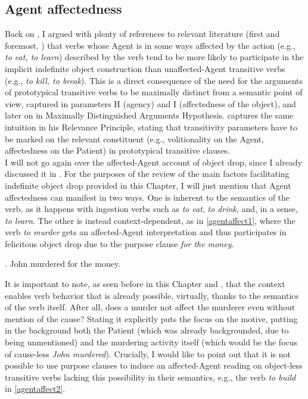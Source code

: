 \subsection{Agent affectedness} 

Back on , I argued with plenty of references to relevant literature (first and foremost, \textcite{Naess2007}) that verbs whose Agent is in some ways affected by the action (e.g., \textit{to eat, to learn}) described by the verb tend to be more likely to participate in the implicit indefinite object construction than unaffected-Agent transitive verbs (e.g., \textit{to kill, to break}). This is a direct consequence of the need for the arguments of prototypical transitive verbs to be maximally distinct from a semantic point of view, captured in  parameters H (agency) and I (affectedness of the object), and later on in  Maximally Distinguished Arguments Hypothesis. \textcite[335]{malchukov2006transitivity} captures the same intuition in his Relevance Principle, stating that  transitivity parameters have to be marked on the relevant constituent (e.g., volitionality on the Agent, affectedness on the Patient) in prototypical transitive clauses.\\
I will not go again over the affected-Agent account of object drop, since I already discussed it in . For the purposes of the review of the main factors facilitating indefinite object drop provided in this Chapter, I will just mention that Agent affectedness can manifest in two ways. One is inherent to the semantics of the verb, as it happens with ingestion verbs such as \textit{to eat}, \textit{to drink}, and, in a sense, \textit{to learn}. The other is instead context-dependent, as in \ref{agentaffect1}, where the verb \textit{to murder} gets an affected-Agent interpretation and thus participates in felicitous object drop due to the purpose clause \textit{for the money}.

\ex. \label{agentaffect1} John murdered for the money. \hfill \parencite[136]{Naess2007}

It is important to note, as seen before in this Chapter and , that the context enables verb behavior that is already possible, virtually, thanks to the semantics of the verb itself. After all, does a murder not affect the murderer even without mention of the cause? Stating it explicitly puts the focus on the motive, putting in the background both the Patient (which was already backgrounded, due to being unmentioned) and the murdering activity itself (which would be the focus of cause-less \textit{John murdered}). Crucially, I would like to point out that it is not possible to use purpose clauses to induce an affected-Agent reading on object-less transitive verbs lacking this possibility in their semantics, e.g., the verb \textit{to build} in \ref{agentaffect2}.

